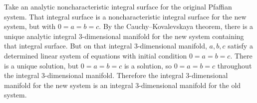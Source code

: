 \begin{example}
Take an analytic noncharacteristic integral surface for the original Pfaffian system.
That integral surface is a noncharacteristic integral surface for the new system, but with \(0=a=b=c\).
By the Cauchy--Kovalevskaya theorem,
 there is a unique analytic integral 3-dimensional manifold for the new system containing that integral surface.
But on that integral 3-dimensional manifold, \(a,b,c\) satisfy a determined linear system of equations with initial condition \(0=a=b=c\).
There is a unique solution, but \(0=a=b=c\) is a solution, so \(0=a=b=c\) throughout the integral 3-dimensional manifold.
Therefore the integral 3-dimensional manifold for the new system is an integral 3-dimensional manifold for the old system.
\end{example}




